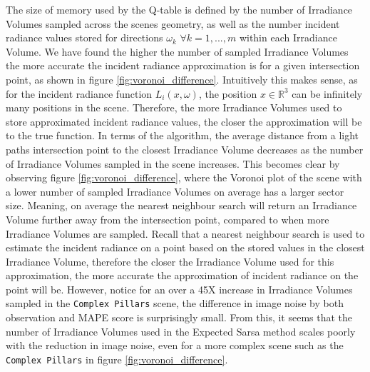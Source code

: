 \documentclass[../dissertation.tex]{subfiles}
\begin{document}
The size of memory used by the Q-table is defined by the number of Irradiance Volumes sampled across the scenes geometry, as well as the number incident radiance values stored for directions $\omega_k$ $\forall k = 1,...,m$  within each Irradiance Volume. We have found the higher the number of sampled Irradiance Volumes the more accurate the incident radiance approximation is for a given intersection point, as shown in figure \ref{fig:voronoi_difference}.  Intuitively this makes sense, as for the incident radiance function $L_i(x, \omega)$, the position $x \in \mathbb{R}^3$ can be infinitely many positions  in the scene. Therefore, the more Irradiance Volumes used to store approximated incident radiance values, the closer the approximation will be to the true function. In terms of the algorithm, the average distance from a light paths intersection point to the closest Irradiance Volume decreases as the number of Irradiance Volumes sampled in the scene increases. This becomes clear by observing figure \ref{fig:voronoi_difference}, where the Voronoi plot of the scene with a lower number of sampled Irradiance Volumes on average has a larger sector size. Meaning, on average the nearest neighbour search will return an Irradiance Volume further away from the intersection point, compared to when more Irradiance Volumes are sampled. Recall that a nearest neighbour search is used to estimate the incident radiance on a point based on the stored values in the closest Irradiance Volume, therefore the closer the Irradiance Volume used for this approximation, the more accurate the approximation of incident radiance on the point will be. However, notice for an over a 45X increase in Irradiance Volumes sampled in the \verb|Complex Pillars| scene, the difference in image noise by both observation and MAPE score is surprisingly small. From this, it seems that the number of Irradiance Volumes used in the Expected Sarsa method scales poorly with the reduction in image noise, even for a more complex scene such as the \verb|Complex Pillars| in figure \ref{fig:voronoi_difference}.
\end{document}
